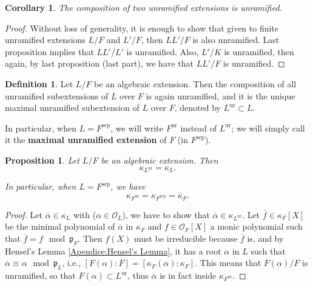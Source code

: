 \documentclass[12pt]{article}
\theoremstyle{plain}
\newtheorem{proposition}[theorem]{Proposition}
\newtheorem{corollary}[theorem]{Corollary}
\theoremstyle{definition}
\newtheorem{definition}[theorem]{Definition}
\newenvironment{Proposition}{\colorlet{shadecolor}{Green!12} \begin{shaded} \begin{proposition}}{ \end{proposition}\end{shaded}}
\renewcommand{\bar}[1]{\overline{#1}}
\newcommand{\primo}[1]{\mathfrak{#1}}
\renewcommand{\O}{\mathcal{O}}
\newcommand{\sep}[1]{{#1}^{\operatorname{sep}}}
\newcommand{\ur}[1]{{#1}^{\operatorname{ur}}}
\begin{document}
\begin{corollary}
The composition of two unramified extensions is unramified.
\end{corollary}
\begin{proof}
Without loss of generality, it is enough to show that given to finite unramified extensions $L/F$ and $L'/F$, then $LL'/F$ is also unramified. Last proposition implies that $L L'/L'$ is unramified. Also, $L'/K$ is unramified, then again, by last proposition (last part), we have that $LL'/F$ is unramified.
\end{proof}

\begin{definition}
Let $L/F$ be an algebraic extension. Then the composition of all unramified subextensions of $L$ over $F$ is again unramified, and it is the unique maximal unramified subextension of $L$ over $F$, denoted by $\ur L \subset L$.

In particular, when $L = \sep F$, we will write $\ur F$ instead of $\ur L$; we will simply call it the \textbf{maximal unramified extension} of $F$ (in $\sep F$).
\end{definition}

\begin{Proposition}\label{proposition:if L/F is algebraic then kappa_Lur = kappa_L}
Let $L/F$ be an algebraic extension. Then
\[
    \kappa_{\ur L} = \kappa_L.
\]

In particular, when $L = \sep F$, we have
\[
    \kappa_{\ur F} = \kappa_{\sep F} = \bar \kappa_F.
\]

\end{Proposition}
\begin{proof}
Let $\bar \alpha \in \kappa_L$ with ($\alpha \in \O_L$), we have to show that $\bar \alpha \in \kappa_{\ur L}$. Let $\bar f \in \kappa_F [X]$ be the minimal polynomial of $\bar \alpha$ in $\kappa_F$ and $f\in \O_F [X]$ a monic polynomial such that $\bar f = f \mod \primo p_F$. Then $f(X)$ must be irreducible because $\bar f$ is, and by Hensel's Lemma \ref{Apendice:Hensel's Lemma}, it has a root $\alpha$ in $L$ such that $\bar \alpha \equiv \alpha \mod \primo p_L$, i.e., $[F(\alpha) : F] = [\kappa_F (\bar \alpha) : \kappa_F]$. This means that $F(\alpha)/F$ is unramified, so that $F(\alpha) \subset \ur L$, thus $\bar \alpha$ is in fact inside $\kappa_{\ur F}$.
\end{proof}
\end{document}
